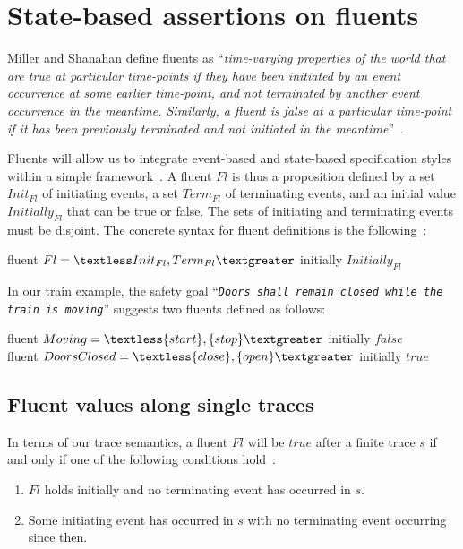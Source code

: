 \section{State-based assertions on fluents\label{section:background-fluents}}

Miller and Shanahan define fluents as ``\emph{time-varying properties of the world that are true at particular time-points if they have been initiated by an event occurrence at some earlier time-point, and not terminated by another event occurrence in the meantime. Similarly, a fluent is false at a particular time-point if it has been previously terminated and not initiated in the meantime}''~\cite{Miller:2002}.

Fluents will allow us to integrate event-based and state-based specification styles within a simple framework~\cite{Giannakopoulou:2003}. A fluent $Fl$ is thus a proposition defined by a set $Init_{Fl}$ of initiating events, a set $Term_{Fl}$ of terminating events, and an initial value $Initially_{Fl}$ that can be true or false. The sets of initiating and terminating events must be disjoint. The concrete syntax for fluent definitions is the following~\cite{Giannakopoulou:2003}:

\begin{center}
fluent $Fl = \textless Init_{Fl}, Term_{Fl} \textgreater $ initially $Initially_{Fl}$
\end{center}

In our train example, the safety goal ``\emph{\texttt{Doors shall remain closed while the train is moving}}'' suggests two fluents defined as follows:

\begin{center}
fluent $Moving = \textless \{start\}, \{stop\} \textgreater $ initially $false$ \\
fluent $DoorsClosed = \textless \{close\}, \{open\} \textgreater $ initially $true$ \\
\end{center}

\subsection{Fluent values along single traces\label{subsection:background-fluents-single-traces}}

In terms of our trace semantics, a fluent $Fl$ will be $true$ after a finite trace $s$ if and only if one of the following conditions hold~\cite{Giannakopoulou:2003}:

\begin{enumerate}
\item $Fl$ holds initially and no terminating event has occurred in $s$.
\item Some initiating event has occurred in $s$ with no terminating event occurring since then.
\end{enumerate}

